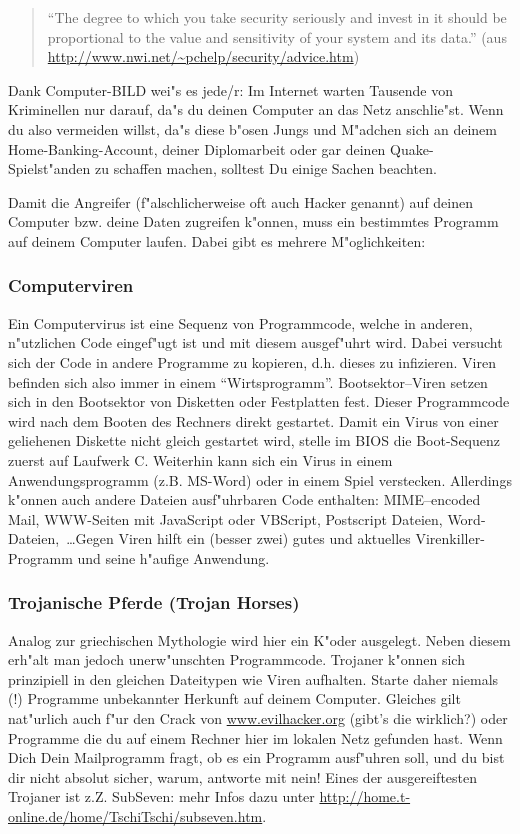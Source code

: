 \documentclass[12pt,titlepage,twoside]{scrartcl}
\begin{document}
\begin{quote}
"`The degree to which you take security seriously and invest
in it should be proportional to the value and sensitivity of
your system and its data."' (aus \url{http://www.nwi.net/~pchelp/security/advice.htm})
\end{quote}

Dank Computer-BILD wei"s es jede/r: Im Internet warten Tausende 
von Kriminellen nur darauf, da"s du deinen Computer an das Netz anschlie"st.
Wenn du also vermeiden willst, da"s diese b"osen Jungs und M"adchen sich an 
deinem Home-Banking-Account, deiner Diplomarbeit oder gar deinen 
Quake-Spielst"anden zu schaffen machen, solltest Du einige Sachen beachten. 

Damit die Angreifer (f"alschlicherweise oft auch Hacker genannt) auf deinen
Computer bzw. deine Daten zugreifen k"onnen, muss ein bestimmtes Programm auf 
deinem Computer laufen. Dabei gibt es mehrere M"oglichkeiten:

\subsubsection{Computerviren}
Ein Computervirus ist eine Sequenz von Programmcode, welche 
in anderen, n"utzlichen Code eingef"ugt ist und mit diesem ausgef"uhrt wird. 
Dabei versucht sich der Code in andere Programme zu kopieren, d.h. dieses zu 
infizieren. Viren befinden sich also immer in einem "`Wirtsprogramm"'. 
Bootsektor--Viren setzen sich in den Bootsektor von Disketten oder Festplatten
fest. Dieser Programmcode wird nach dem Booten des Rechners direkt gestartet.
Damit ein Virus von einer geliehenen Diskette nicht gleich gestartet
wird, stelle im BIOS die Boot-Sequenz zuerst auf Laufwerk C.
Weiterhin kann sich ein Virus in einem Anwendungsprogramm (z.B. MS-Word) oder
in einem Spiel verstecken. Allerdings k"onnen auch andere Dateien ausf"uhrbaren
Code enthalten: MIME--encoded Mail, WWW-Seiten mit JavaScript oder VBScript,
Postscript Dateien, Word-Dateien,~\dots Gegen Viren hilft ein (besser zwei) gutes
und aktuelles Virenkiller-Programm und seine h"aufige Anwendung.

\subsubsection{Trojanische Pferde (Trojan Horses)} 
Analog zur griechischen Mythologie wird
hier ein K"oder ausgelegt. Neben diesem erh"alt man jedoch unerw"unschten
Programmcode. Trojaner k"onnen sich prinzipiell in den gleichen Dateitypen
wie Viren aufhalten. Starte daher niemals (!) Programme unbekannter Herkunft 
auf deinem Computer. Gleiches gilt nat"urlich auch f"ur den Crack von
\url{www.evilhacker.org} (gibt's die wirklich?) oder Programme die du auf einem
Rechner hier im lokalen Netz gefunden hast. Wenn Dich Dein Mailprogramm fragt,
ob es ein Programm ausf"uhren soll, und du bist dir nicht absolut sicher, warum,
antworte mit nein! Eines der ausgereiftesten Trojaner ist z.Z. SubSeven: mehr
Infos dazu unter \url{http://home.t-online.de/home/TschiTschi/subseven.htm}.
\end{document}

